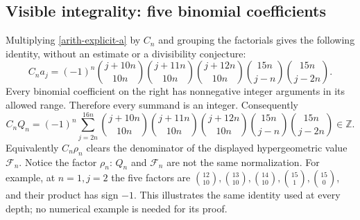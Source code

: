 \documentclass[11pt]{article}
\newcommand{\Z}{\mathbb Z}
\begin{document}
\subsection{Visible integrality: five binomial coefficients}
Multiplying \eqref{arith-explicit-a} by $C_n$ and grouping the factorials gives
the following identity, without an estimate or a divisibility conjecture:
\begin{equation}\label{arith-five-binomials}
 \boxed{\displaystyle
 C_na_j=(-1)^n
 \binom{j+10n}{10n}\binom{j+11n}{10n}\binom{j+12n}{10n}
 \binom{15n}{j-n}\binom{15n}{j-2n}.}
\end{equation}
Every binomial coefficient on the right has nonnegative integer arguments
in its allowed range. Therefore every summand is an integer. Consequently
\[
 C_nQ_n=(-1)^n\sum_{j=2n}^{16n}
 \binom{j+10n}{10n}\binom{j+11n}{10n}\binom{j+12n}{10n}
 \binom{15n}{j-n}\binom{15n}{j-2n}\in\Z.
\]
Equivalently $C_n\rho_n$ clears the denominator of the displayed
hypergeometric value $\mathcal F_n$. Notice the factor $\rho_n$:
$Q_n$ and $\mathcal F_n$ are not the same normalization.
For example, at $n=1,j=2$ the five factors are
$\binom{12}{10},\binom{13}{10},\binom{14}{10},\binom{15}{1},\binom{15}{0}$,
and their product has sign $-1$. This illustrates the same identity used
at every depth; no numerical example is needed for its proof.
\end{document}
